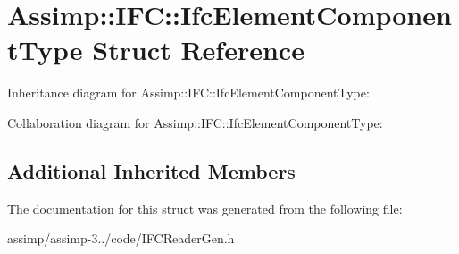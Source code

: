 \hypertarget{struct_assimp_1_1_i_f_c_1_1_ifc_element_component_type}{\section{Assimp\+:\+:I\+F\+C\+:\+:Ifc\+Element\+Component\+Type Struct Reference}
\label{struct_assimp_1_1_i_f_c_1_1_ifc_element_component_type}
}


Inheritance diagram for Assimp\+:\+:I\+F\+C\+:\+:Ifc\+Element\+Component\+Type\+:


Collaboration diagram for Assimp\+:\+:I\+F\+C\+:\+:Ifc\+Element\+Component\+Type\+:
\subsection*{Additional Inherited Members}


The documentation for this struct was generated from the following file\+:\begin{DoxyCompactItemize}
\item 
assimp/assimp-\/3../code/I\+F\+C\+Reader\+Gen.\+h\end{DoxyCompactItemize}
